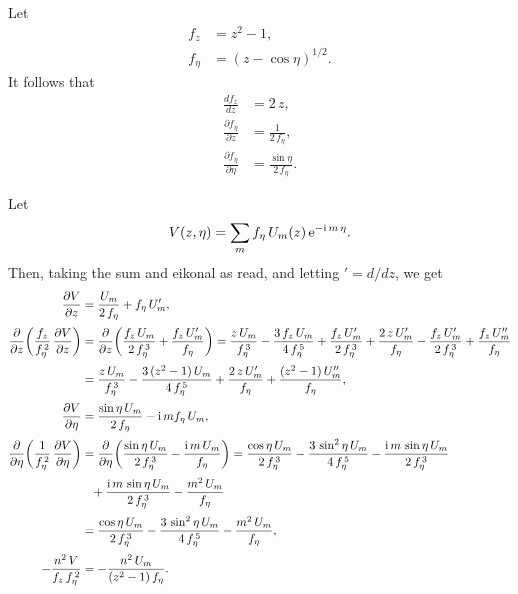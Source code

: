 \documentclass[12pt,prb,aps,notitlepage]{revtex4-1}
\begin{document}
Let
\begin{align}
f_z &= z^2-1,\\[0.5ex]
f_\eta &= (z-\cos\eta)^{1/2}.
\end{align}
It follows that
\begin{align}
\frac{df_z}{dz} &= 2\,z,\\[0.5ex]
\frac{\partial f_\eta}{\partial z}&= \frac{1}{2\,f_\eta},\\[0.5ex]
\frac{\partial f_\eta}{\partial\eta} &= \frac{\sin\eta}{2\,f_\eta}.
\end{align}

Let
\begin{equation}
V(z,\eta)= \sum_m f_\eta\,U_m(z)\,{\rm e}^{-{\rm i}\,m\,\eta}.
\end{equation}
Then, taking the sum and eikonal as read, and letting $'=d/dz$, we get 
\begin{align}
\frac{\partial V}{\partial z} &=\frac{U_m}{2\,f_\eta} + f_\eta\,U_m',\\[0.5ex]
\frac{\partial}{\partial z}\!\left(\frac{f_z}{f_\eta^{\,2}}\,\frac{\partial V}{\partial z}\right)&=
\frac{\partial}{\partial z}\!\left(\frac{f_z\,U_m}{2\,f_\eta^{\,3}}+ \frac{f_z\,U_m'}{f_\eta}\right)
= \frac{z\,U_m}{f_\eta^{\,3}} -\frac{3\,f_z\,U_m}{4\,f_\eta^{\,5}}+\frac{f_z\,U_m'}{2\,f_\eta^{\,3}}
+\frac{2\,z\,U_m'}{f_\eta}- \frac{f_z\,U_m'}{2\,f_\eta^{\,3}}
+\frac{f_z\,U_m''}{f_\eta}\nonumber\\[0.5ex]
&=\frac{z\,U_m}{f_\eta^{\,3}} -\frac{3\,(z^2-1)\,U_m}{4\,f_\eta^{\,5}}
+\frac{2\,z\,U_m'}{f_\eta}
+\frac{(z^2-1)\,U_m''}{f_\eta},\\[0.5ex]
\frac{\partial V}{\partial \eta} &=\frac{\sin\eta\,U_m}{2\,f_\eta} -{\rm i}\,m f_\eta\,U_m,\\[0.5ex]
\frac{\partial}{\partial \eta}\!\left(\frac{1}{f_\eta^{\,2}}\,\frac{\partial V}{\partial \eta}\right)&=
\frac{\partial}{\partial \eta}\!\left(\frac{\sin\eta\,U_m}{2\,f_\eta^{\,3}}-\frac{{\rm i}\,m\,U_m}{f_\eta}\right)=
\frac{\cos\eta\,U_m}{2\,f_\eta^{\,3}}- \frac{3\,\sin^2\eta\,U_m}{4\,f_\eta^{\,5}}-\frac{{\rm i}\,m\,\sin\eta\,U_m}{2\,f_\eta^{\,3}}\nonumber\\[0.5ex]
&\phantom{=} + \frac{{\rm i}\,m\,\sin\eta\,U_m}{2\,f_\eta^{\,3}} - \frac{m^2\,U_m}{f_\eta}\nonumber\\[0.5ex]
&=\frac{\cos\eta\,U_m}{2\,f_\eta^{\,3}}- \frac{3\,\sin^2\eta\,U_m}{4\,f_\eta^{\,5}} - \frac{m^2\,U_m}{f_\eta},\\[0.5ex]
-\frac{n^2\,V}{f_z\,f_\eta^{\,2}}&= -\frac{n^2\,U_m}{(z^2-1)\,f_\eta}.
\end{align}
\end{document}
